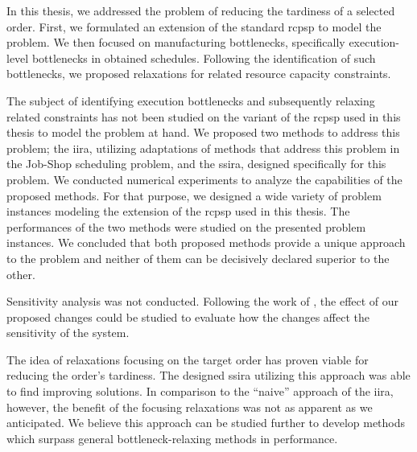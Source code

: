  \label{chap:conclussion}

In this thesis, we addressed the problem of reducing the tardiness of a selected order.
First, we formulated an extension of the standard \ac{rcpsp} to model the problem.
We then focused on manufacturing bottlenecks,
specifically execution-level bottlenecks in obtained schedules.
Following the identification of such bottlenecks,
we proposed relaxations for related resource capacity constraints.


The subject of identifying execution bottlenecks and subsequently relaxing related constraints
has not been studied on the variant of the \acs{rcpsp} used in this thesis to model the problem at hand.
We proposed two methods to address this problem;
the \ac{iira}, utilizing adaptations of methods
that address this problem in the Job-Shop scheduling problem,
and the \ac{ssira}, designed specifically for this problem.
We conducted numerical experiments to analyze the capabilities of the proposed methods.
For that purpose, we designed a wide variety of problem instances
modeling the extension of the \ac{rcpsp} used in this thesis.
The performances of the two methods were studied on the presented problem instances.
We concluded that both proposed methods provide a unique approach to the problem
and neither of them can be decisively declared superior to the other.


Sensitivity analysis was not conducted.
Following the work of \citet{Lawrence1994},
the effect of our proposed changes could be studied
to evaluate how the changes affect the sensitivity of the system.

The idea of relaxations focusing on the target order has proven viable for reducing the order's tardiness.
The designed \ac{ssira} utilizing this approach was able to find improving solutions.
In comparison to the \enquote{naive} approach of the \ac{iira}, however,
the benefit of the focusing relaxations was not as apparent as we anticipated.
We believe this approach can be studied further to develop methods
which surpass general bottleneck-relaxing methods in performance.
